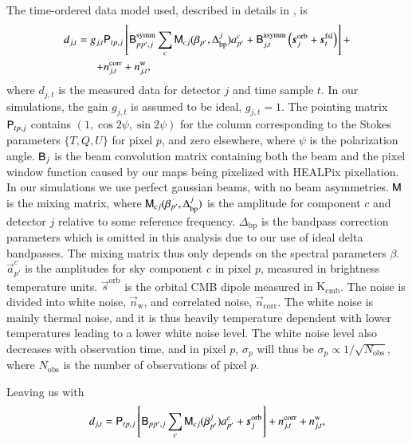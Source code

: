 \documentclass[twocolumn]{aa}
\newcommand{\n}[0]{\vec{n}}
\newcommand{\s}[0]{\vec{s}}
\renewcommand{\a}[0]{\vec{a}}
\newcommand{\B}[0]{\tens{B}}
\newcommand{\M}[0]{\tens{M}}
\renewcommand{\P}[0]{\tens{P}}
\begin{document}
The time-ordered data model used, described in details in \citet{bp01}, is
\begin{equation}
  \begin{split}
    d_{j,t} = g_{j,t}&\P_{tp,j}\left[\B^{\mathrm{symm}}_{pp',j}\sum_{c}
      \M_{cj}(\beta_{p'}, \Delta_{\mathrm{bp}}^{j})a^c_{p'}  + \B^{\mathrm{asymm}}_{j,t}\left(\s^{\mathrm{orb}}_{j}  
      + \s^{\mathrm{fsl}}_{t}\right)\right] + \\
    	+ &n^{\mathrm{corr}}_{j,t} + n^{\mathrm{w}}_{j,t},
  \end{split}
  \label{eq:todmodel}
\end{equation}
%
where $d_{j,t}$ is the measured data for detector $j$ and time sample $t$. In our simulations, the gain $g_{j,t}$ is assumed to be ideal, $g_{j,t}=1$. The pointing matrix $\P_{tp,j}$ contains $(1,\cos{2\psi}, \sin{2\psi})$ for the column corresponding to the Stokes parameters $\{T,Q,U\}$ for pixel $p$, and zero elsewhere, where $\psi$ is the polarization angle. $\B_j$ is the beam convolution matrix containing both the beam and the pixel window function caused by our maps being pixelized with HEALPix pixellation. In our simulations we use perfect gaussian beams, with no beam asymmetries. $\M$ is the mixing matrix, where $\M_{cj}(\beta_{p'}, \Delta_{\mathrm{bp}}^{j})$ is the amplitude for component $c$ and detector $j$ relative to some reference frequency. $\Delta_{\mathrm{bp}}$ is the bandpass correction parameters which is omitted in this analysis due to our use of ideal delta bandpasses. The mixing matrix thus only depends on the spectral parameters $\beta$. $\a^c_{p'}$ is the amplitudes for sky component $c$ in pixel $p$, measured in brightness temperature units. $\s^{\mathrm{orb}}$ is the orbital CMB dipole measured in $\mathrm{K_{cmb}}$. The noise is divided  into white noise, $\n_{\mathrm{w}}$, and correlated noise, $\n_{\mathrm{corr}}$. The white noise is mainly thermal noise, and it is thus heavily temperature dependent with lower temperatures leading to a lower white noise level. The white noise  level also decreases with observation time, and in pixel $p$, $\sigma_p$ will thus be $\sigma_p \propto 1/\sqrt{N_{\mathrm{obs}}}$, where $N_{\mathrm{obs}}$ is the number of observations of pixel $p$. 

Leaving us with
\begin{equation}
    d_{j,t} = \P_{tp,j}\left[\B_{pp',j}\sum_{c} \M_{cj}(\beta_{p'}^{j})a^c_{p'}  + \s^{\mathrm{orb}}_{j}\right] 
    	+ n^{\mathrm{corr}}_{j,t} + n^{\mathrm{w}}_{j,t},
  \label{eq:todmodel_LB}
\end{equation}
%
\end{document}
